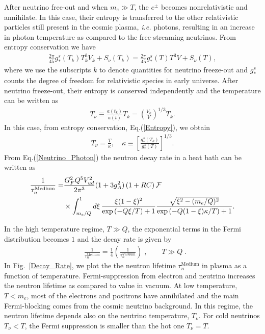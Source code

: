 After neutrino free-out and when $m_e\gg T$, the $e^{\pm}$ becomes nonrelativistic and annihilate. In this case, their entropy is transferred to the other relativistic particles still present in the cosmic plasma, {\it i.e.\/} photons, resulting in an increase in photon temperature as compared to the free-streaming neutrinos. From entropy conservation we have
\begin{align}
\label{Entropy}
\frac{2\pi}{45}g^s_\ast(T_k)T^3_kV_k+S_{\nu}(T_k)=\frac{2\pi}{45}g^s_\ast(T)T^3V+S_{\nu}(T),
\end{align}
where we use the subscripts $k$ to denote quantities for neutrino freeze-out and $g^s_\ast$ counts the degree of freedom for relativistic species in early universe. After neutrino freeze-out, their entropy is conserved independently and the temperature can be written as
\begin{align}
T_\nu\equiv\frac{a(t_k)}{a(t)}T_k=\left(\frac{V_k}{V}\right)^{1/3}T_k.
\end{align}
In this case, from entropy conservation, Eq.(\ref{Entropy}), we obtain
\begin{align}
\label{Neutrino_Photon}
T_\nu=\frac{T}{\kappa},\,\,\,\,\,\,\kappa\equiv\left[\frac{g^s_\ast(T_k)}{g^s_\ast(T)}\right]^{1/3}.
\end{align}
From Eq.(\ref{Neutrino_Photon}) the neutron decay rate in a heat bath can be written as
\begin{align}
\label{Decay_rate_03}
\frac{1}{\tau_n^\mathrm{Medium}}=&\frac{G^2_FQ^5V^2_{ud}}{2\pi^3}(1+3g^2_A)\,(1+RC)\,\mathcal{F}\\
&\times\int^1_{m_e/Q}d\xi\,\frac{\xi(1-\xi)^2}{\exp\left(-Q\xi/{T}\right)+1}\frac{\sqrt{\xi^2-(m_e/Q)^2}}{\exp\left(-Q(1-\xi)\kappa/T\right)+1}.\notag
\end{align}

In the high temperature regime, $T\gg Q$, the exponential terms in the Fermi distribution becomes $1$ and the decay rate is given by
\begin{align}
&\frac{1}{\tau_n^\mathrm{Medium}}=\frac{1}{4}\left(\frac{1}{\tau_n^\mathrm{Vacuum}}\right)\;,
\qquad
T\gg Q\;.
\end{align}
In Fig.~\ref{Decay_Rate}, we plot the the neutron lifetime $\tau^\mathrm{Medium}_n$ in plasma as a function of temperature. Fermi-suppression from electron and neutrino increases the neutron lifetime as compared to value in vacuum. At low temperature, $T<m_e$, most of the electrons and positrons have annihilated and the main Fermi-blocking comes from the cosmic neutrino background. In this regime, the neutron lifetime depends also on the neutrino temperature, $T_\nu$. For cold neutrinos $T_\nu<T$, the Fermi suppression is smaller than the hot one $T_\nu=T$. 

